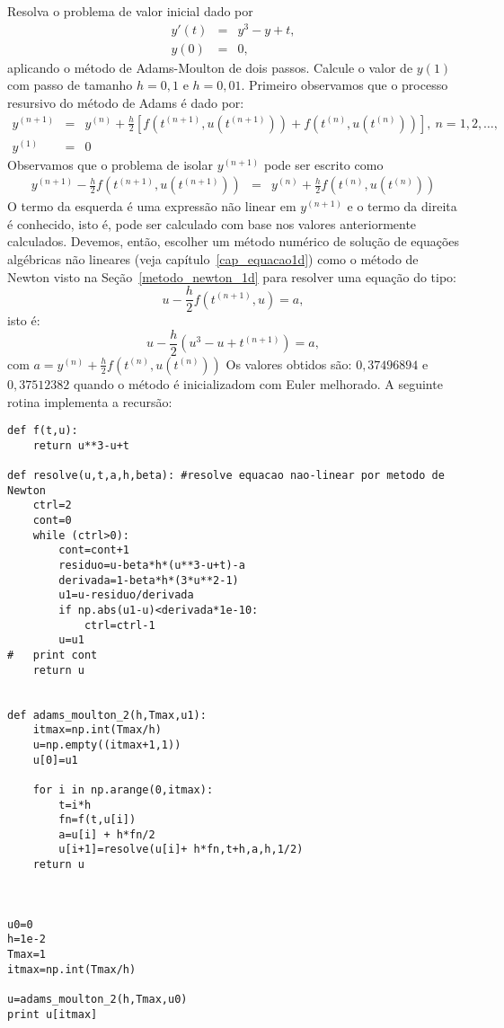 \begin{exeresol}\label{pvi:exersol_moulton_nl} Resolva o problema de valor inicial dado por
\begin{eqnarray*}
 y'(t)&=& y^3-y+t,\\
 y(0)&=& 0,
\end{eqnarray*}
aplicando o método de Adams-Moulton de dois passos. Calcule o valor de $y(1)$ com passo de tamanho $h=0,1$ e $h=0,01$.
Primeiro observamos que o processo resursivo do método de Adams é dado por: 
\begin{eqnarray*}
  y^{(n+1)}&=&y^{(n)}+\frac{h}{2}\left[f\left(t^{(n+1)},u(t^{(n+1)})\right)+f\left(t^{(n)},u(t^{(n)})\right)\right],~n=1,2,\ldots,\\
  y^{(1)}&=&0
 \end{eqnarray*}
Observamos que o problema de isolar $y^{(n+1)}$ pode ser escrito como
\begin{eqnarray*}
  y^{(n+1)}-\frac{h}{2}f\left(t^{(n+1)},u(t^{(n+1)})\right) &=&y^{(n)}+\frac{h}{2}f\left(t^{(n)},u(t^{(n)})\right)
 \end{eqnarray*}
O termo da esquerda é uma expressão não linear em $y^{(n+1)}$ e o termo da direita é conhecido, isto é, pode ser calculado com base nos valores anteriormente calculados. Devemos, então, escolher um método numérico de solução de equações algébricas não lineares (veja capítulo~\ref{cap_equacao1d}) como o método de Newton visto na Seção~\ref{metodo_newton_1d} para resolver uma equação do tipo:
$$u-\frac{h}{2}f(t^{(n+1)},u)=a,$$
isto é:
$$u-\frac{h}{2}\left(u^3-u+t^{(n+1)}\right)=a,$$
com $a=y^{(n)}+\frac{h}{2}f\left(t^{(n)},u(t^{(n)})\right)$
Os valores obtidos são: $0,37496894$ e $0,37512382$ quando o método é inicializadom com Euler melhorado.
\ifispython
A seguinte rotina implementa a recursão:
\begin{verbatim}
def f(t,u):
	return u**3-u+t

def resolve(u,t,a,h,beta): #resolve equacao nao-linear por metodo de Newton
	ctrl=2
	cont=0
	while (ctrl>0):
		cont=cont+1
		residuo=u-beta*h*(u**3-u+t)-a
		derivada=1-beta*h*(3*u**2-1)
		u1=u-residuo/derivada
		if np.abs(u1-u)<derivada*1e-10:
			ctrl=ctrl-1
		u=u1
#	print cont
	return u


def adams_moulton_2(h,Tmax,u1):
	itmax=np.int(Tmax/h)
	u=np.empty((itmax+1,1))
	u[0]=u1

	for i in np.arange(0,itmax):
		t=i*h
		fn=f(t,u[i])
		a=u[i] + h*fn/2
		u[i+1]=resolve(u[i]+ h*fn,t+h,a,h,1/2)
	return u



u0=0
h=1e-2
Tmax=1
itmax=np.int(Tmax/h)

u=adams_moulton_2(h,Tmax,u0)
print u[itmax]

\end{verbatim}

\fi
\end{exeresol}


